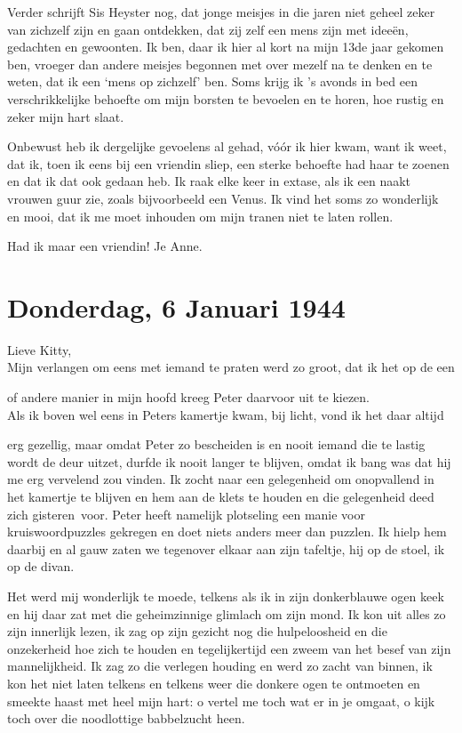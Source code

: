 \documentclass{book}
\begin{document}
Verder schrijft Sis Heyster nog, dat jonge meisjes in die jaren niet
geheel zeker van zichzelf zijn en gaan ontdekken, dat zij zelf een mens
zijn met ideeën, gedachten en gewoonten. Ik ben, daar ik hier al kort na
mijn 13de jaar gekomen ben, vroeger dan andere meisjes begonnen met over
mezelf na te denken en te weten, dat ik een `mens op zichzelf' ben. Soms
krijg ik 's avonds in bed een verschrikkelijke behoefte om mijn borsten
te bevoelen en te horen, hoe rustig en zeker mijn hart slaat.

Onbewust heb ik dergelijke gevoelens al gehad, vóór ik hier kwam, want
ik weet, dat ik, toen ik eens bij een vriendin sliep, een sterke
behoefte had haar te zoenen en dat ik dat ook gedaan heb. Ik raak elke
keer in extase, als ik een naakt vrouwen guur zie, zoals bijvoorbeeld
een Venus. Ik vind het soms zo wonderlijk en mooi, dat ik me moet
inhouden om mijn tranen niet te laten rollen.

Had ik maar een vriendin! Je Anne.

\chapter{Donderdag, 6 Januari 1944}

Lieve Kitty,\\Mijn verlangen om eens met iemand te praten werd zo groot,
dat ik het op de een

of andere manier in mijn hoofd kreeg Peter daarvoor uit te kiezen.\\Als
ik boven wel eens in Peters kamertje kwam, bij licht, vond ik het daar
altijd

erg gezellig, maar omdat Peter zo bescheiden is en nooit iemand die te
lastig wordt de deur uitzet, durfde ik nooit langer te blijven, omdat ik
bang was dat hij me erg vervelend zou vinden. Ik zocht naar een
gelegenheid om onopvallend in het kamertje te blijven en hem aan de
klets te houden en die gelegenheid deed zich gisteren~voor. Peter heeft
namelijk plotseling een manie voor kruiswoordpuzzles gekregen en doet
niets anders meer dan puzzlen. Ik hielp hem daarbij en al gauw zaten we
tegenover elkaar aan zijn tafeltje, hij op de stoel, ik op de divan.

Het werd mij wonderlijk te moede, telkens als ik in zijn donkerblauwe
ogen keek en hij daar zat met die geheimzinnige glimlach om zijn mond.
Ik kon uit alles zo zijn innerlijk lezen, ik zag op zijn gezicht nog die
hulpeloosheid en die onzekerheid hoe zich te houden en tegelijkertijd
een zweem van het besef van zijn mannelijkheid. Ik zag zo die verlegen
houding en werd zo zacht van binnen, ik kon het niet laten telkens en
telkens weer die donkere ogen te ontmoeten en smeekte haast met heel
mijn hart: o vertel me toch wat er in je omgaat, o kijk toch over die
noodlottige babbelzucht heen.
\end{document}

